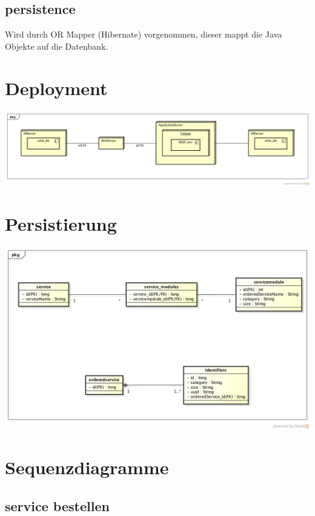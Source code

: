 \documentclass[11pt]{scrartcl}
\begin{document}
\subsection{persistence}

Wird durch OR Mapper (Hibernate) vorgenommen, dieser mappt die Java Objekte auf 
die Datenbank.

\section{Deployment}

\includegraphics[width=\textwidth]{deployment}

\section{Persistierung}

\includegraphics[width=\textwidth]{Datenmodell}

\section{Sequenzdiagramme}
\subsection{service bestellen}
\end{document}
